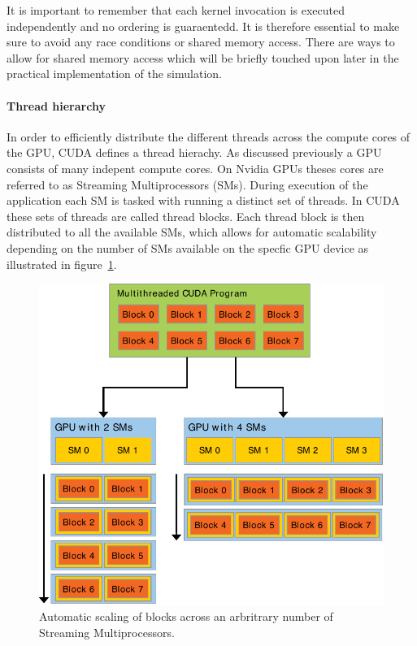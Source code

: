 \documentclass[a4paper,11pt]{kth-mag}
\begin{document}
It is important to remember that each kernel invocation is executed independently and no ordering is guaraentedd. It is therefore essential to make sure to avoid any race conditions or shared memory access. There are ways to allow for shared memory access which will be briefly touched upon later in the practical implementation of the simulation.

\paragraph{Thread hierarchy}

In order to efficiently distribute the different threads across the compute cores of the GPU, CUDA defines a thread hierachy. As discussed previously a GPU consists of many indepent compute cores. On Nvidia GPUs theses cores are referred to as Streaming Multiprocessors (SMs). During execution of the application each SM is tasked with running a distinct set of threads. In CUDA these sets of threads are called thread blocks. Each thread block is then distributed to all the available SMs, which allows for automatic scalability depending on the number of SMs available on the specfic GPU device as illustrated in figure~\ref{fig:automatic_scaling}.

\begin{figure}
  \centering
  \includegraphics[width=\textwidth]{img/automatic_scaling.pdf}
  \caption{Automatic scaling of blocks across an arbritrary number of Streaming Multiprocessors.}
  \label{fig:automatic_scaling}
\end{figure}
\end{document}
